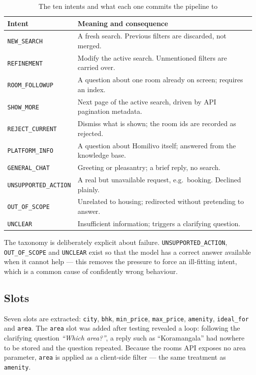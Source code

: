 \documentclass[11pt,a4paper]{article}
\newcommand{\fn}[1]{\texttt{\small #1}}
\begin{document}
\begin{table}[H]
\centering
\caption{The ten intents and what each one commits the pipeline to}
\small
\begin{tabularx}{\textwidth}{@{}l>{\raggedright\arraybackslash}X@{}}
\toprule
\textbf{Intent} & \textbf{Meaning and consequence}\\
\midrule
\fn{NEW\_SEARCH}        & A fresh search. Previous filters are discarded, not merged.\\
\fn{REFINEMENT}         & Modify the active search. Unmentioned filters are carried over.\\
\fn{ROOM\_FOLLOWUP}     & A question about one room already on screen; requires an index.\\
\fn{SHOW\_MORE}         & Next page of the active search, driven by API pagination metadata.\\
\fn{REJECT\_CURRENT}    & Dismiss what is shown; the room ids are recorded as rejected.\\
\fn{PLATFORM\_INFO}     & A question about Homilivo itself; answered from the knowledge base.\\
\fn{GENERAL\_CHAT}      & Greeting or pleasantry; a brief reply, no search.\\
\fn{UNSUPPORTED\_ACTION}& A real but unavailable request, e.g.\ booking. Declined plainly.\\
\fn{OUT\_OF\_SCOPE}     & Unrelated to housing; redirected without pretending to answer.\\
\fn{UNCLEAR}            & Insufficient information; triggers a clarifying question.\\
\bottomrule
\end{tabularx}
\end{table}

The taxonomy is deliberately explicit about failure. \fn{UNSUPPORTED\_ACTION},
\fn{OUT\_OF\_SCOPE} and \fn{UNCLEAR} exist so that the model has a correct answer available
when it cannot help --- this removes the pressure to force an ill-fitting intent, which is a
common cause of confidently wrong behaviour.

\subsection{Slots}

Seven slots are extracted: \fn{city}, \fn{bhk}, \fn{min\_price}, \fn{max\_price},
\fn{amenity}, \fn{ideal\_for} and \fn{area}. The \fn{area} slot was added after testing
revealed a loop: following the clarifying question \emph{``Which area?''}, a reply such as
``Koramangala'' had nowhere to be stored and the question repeated. Because the rooms API
exposes no area parameter, \fn{area} is applied as a client-side filter --- the same treatment
as \fn{amenity}.
\end{document}
